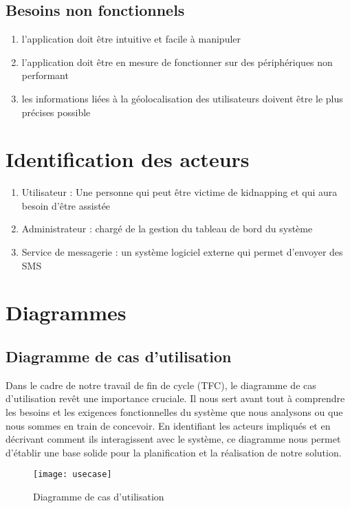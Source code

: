 \subsection{Besoins non fonctionnels}
\begin{enumerate}
	\item l’application doit être intuitive et facile à manipuler
	\item l’application doit être en mesure de fonctionner sur des périphériques non performant 
	\item les informations liées à la géolocalisation des utilisateurs doivent être le plus précises possible
\end{enumerate}

\section{Identification des acteurs}	
\begin{enumerate}
	\item Utilisateur : Une personne qui peut être victime de kidnapping et qui aura besoin d’être assistée
	\item Administrateur : chargé de la gestion du tableau de bord du système
	\item Service de messagerie : un système logiciel externe qui permet d’envoyer des SMS
\end{enumerate}

\section{Diagrammes}
\subsection{Diagramme de cas d’utilisation}
Dans le cadre de notre travail de fin de cycle (TFC), le diagramme de cas d'utilisation revêt une importance cruciale. Il nous sert avant tout à comprendre les besoins et les exigences fonctionnelles du système que nous analysons ou que nous sommes en train de concevoir. En identifiant les acteurs impliqués et en décrivant comment ils interagissent avec le système, ce diagramme nous permet d'établir une base solide pour la planification et la réalisation de notre solution.

\begin{figure}[H]
	\texttt{[image: usecase]}
	\caption{Diagramme de cas d’utilisation}
\end{figure}

